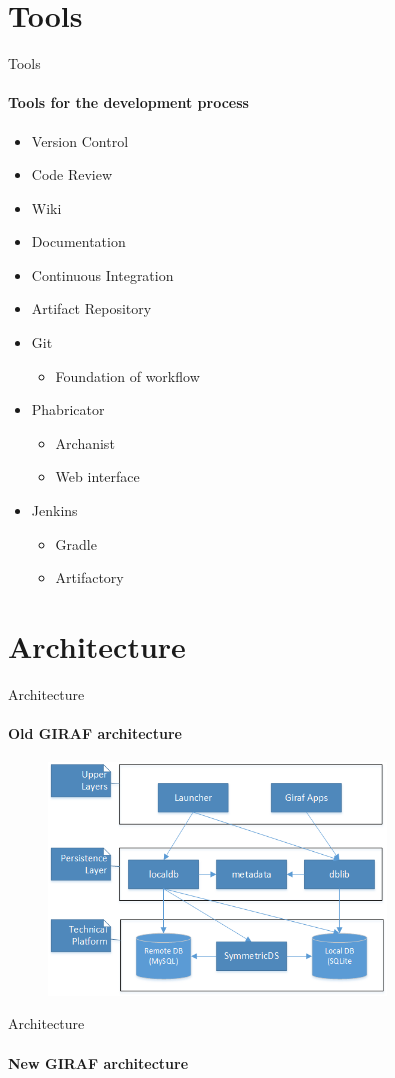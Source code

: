 \section{Tools}
    \begin{frame}[t]{Tools}\framesubtitle{Tools for the development process}
        \begin{itemize}
        	\item Version Control
        	\item Code Review
        	\item Wiki
        	\item Documentation
        	\item Continuous Integration
        	\item Artifact Repository
        \end{itemize}

        \begin{itemize}
            \item Git
        	\begin{itemize}
        		\item Foundation of workflow
        	\end{itemize}
        	\item Phabricator
        	\begin{itemize}
        		\item Archanist
        		\item Web interface
        	\end{itemize}
        	\item Jenkins
        	\begin{itemize}
        		\item Gradle
        		\item Artifactory
        	\end{itemize}
        \end{itemize}
    \end{frame}
\section{Architecture}
    \begin{frame}[t]{Architecture}\framesubtitle{Old GIRAF architecture}
        \begin{figure}
        	\includegraphics[width=0.8\textwidth]{images/old_architecture.png}
        \end{figure}
    \end{frame}

    \begin{frame}[t]{Architecture}\framesubtitle{New GIRAF architecture}
    	\begin{figure}
    		\scalebox{0.6}{%
        	}
        \end{figure}
    \end{frame}